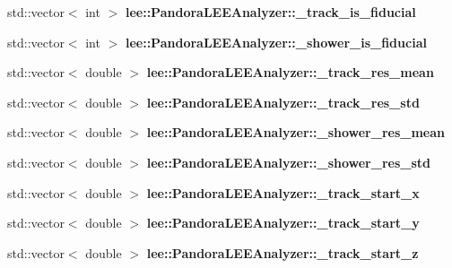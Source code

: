 \begin{DoxyCompactItemize}
\item 
\hypertarget{group__lee_ga0c6ecffb2e944bd9842a1bbc1f6a05f1}{std\-::vector$<$ int $>$ {\bfseries lee\-::\-Pandora\-L\-E\-E\-Analyzer\-::\-\_\-track\-\_\-is\-\_\-fiducial}}\label{group__lee_ga0c6ecffb2e944bd9842a1bbc1f6a05f1}

\item 
\hypertarget{group__lee_ga97495f8c6c496aefe56f07f06a5a55ce}{std\-::vector$<$ int $>$ {\bfseries lee\-::\-Pandora\-L\-E\-E\-Analyzer\-::\-\_\-shower\-\_\-is\-\_\-fiducial}}\label{group__lee_ga97495f8c6c496aefe56f07f06a5a55ce}

\item 
\hypertarget{group__lee_gac8415acd9fe624379b1af65fe523a613}{std\-::vector$<$ double $>$ {\bfseries lee\-::\-Pandora\-L\-E\-E\-Analyzer\-::\-\_\-track\-\_\-res\-\_\-mean}}\label{group__lee_gac8415acd9fe624379b1af65fe523a613}

\item 
\hypertarget{group__lee_gacb00c39c2b71bd7fac4a3c7c6733d514}{std\-::vector$<$ double $>$ {\bfseries lee\-::\-Pandora\-L\-E\-E\-Analyzer\-::\-\_\-track\-\_\-res\-\_\-std}}\label{group__lee_gacb00c39c2b71bd7fac4a3c7c6733d514}

\item 
\hypertarget{group__lee_ga9992152dfa9af10448ef0751007d0c3a}{std\-::vector$<$ double $>$ {\bfseries lee\-::\-Pandora\-L\-E\-E\-Analyzer\-::\-\_\-shower\-\_\-res\-\_\-mean}}\label{group__lee_ga9992152dfa9af10448ef0751007d0c3a}

\item 
\hypertarget{group__lee_ga3a0c057fc83d09918ac2aa805d5bf3c7}{std\-::vector$<$ double $>$ {\bfseries lee\-::\-Pandora\-L\-E\-E\-Analyzer\-::\-\_\-shower\-\_\-res\-\_\-std}}\label{group__lee_ga3a0c057fc83d09918ac2aa805d5bf3c7}

\item 
\hypertarget{group__lee_ga1a0667bd934f598a41bb776e028270f4}{std\-::vector$<$ double $>$ {\bfseries lee\-::\-Pandora\-L\-E\-E\-Analyzer\-::\-\_\-track\-\_\-start\-\_\-x}}\label{group__lee_ga1a0667bd934f598a41bb776e028270f4}

\item 
\hypertarget{group__lee_ga55a26b4d446ea4597e44b2fc22de4cc6}{std\-::vector$<$ double $>$ {\bfseries lee\-::\-Pandora\-L\-E\-E\-Analyzer\-::\-\_\-track\-\_\-start\-\_\-y}}\label{group__lee_ga55a26b4d446ea4597e44b2fc22de4cc6}

\item 
\hypertarget{group__lee_ga71d7b5e5347441a36d0a33710d6c4483}{std\-::vector$<$ double $>$ {\bfseries lee\-::\-Pandora\-L\-E\-E\-Analyzer\-::\-\_\-track\-\_\-start\-\_\-z}}\label{group__lee_ga71d7b5e5347441a36d0a33710d6c4483}


\end{DoxyCompactItemize}
